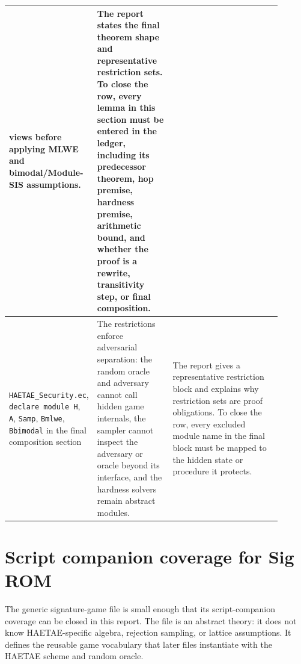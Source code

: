\documentclass[11pt]{report}
\DeclareRobustCommand{\file}[1]{\ifmmode\text{\nolinkurl{#1}}\else\nolinkurl{#1}\fi}
\DeclareRobustCommand{\ec}[1]{\ifmmode\text{\nolinkurl{#1}}\else\nolinkurl{#1}\fi}
\theoremstyle{definition}
\theoremstyle{plain}
\begin{document}
\begin{longtable}{p{0.20\linewidth}p{0.28\linewidth}p{0.42\linewidth}}
views before applying MLWE and bimodal/Module-SIS assumptions. &
The report states the final theorem shape and representative restriction sets.
To close the row, every lemma in this section must be entered in the ledger,
including its predecessor theorem, hop premise, hardness premise, arithmetic
bound, and whether the proof is a rewrite, transitivity step, or final
composition. \\
\midrule
\file{HAETAE\_Security.ec}, \ec{declare module H}, \ec{A}, \ec{Samp},
\ec{Bmlwe}, \ec{Bbimodal} in the final composition section &
The restrictions enforce adversarial separation: the random oracle and
adversary cannot call hidden game internals, the sampler cannot inspect the
adversary or oracle beyond its interface, and the hardness solvers remain
abstract modules. &
The report gives a representative restriction block and explains why
restriction sets are proof obligations.  To close the row, every excluded module
name in the final block must be mapped to the hidden state or procedure it
protects. \\
\bottomrule
\end{longtable}

\section{Script companion coverage for Sig ROM}

The generic signature-game file is small enough that its script-companion
coverage can be closed in this report.  The file is an abstract theory: it does
not know HAETAE-specific algebra, rejection sampling, or lattice assumptions.
It defines the reusable game vocabulary that later files instantiate with the
HAETAE scheme and random oracle.
\end{document}
